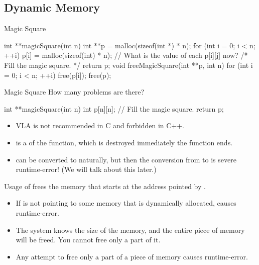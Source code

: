 \documentclass[handout]{beamer}
\begin{document}
\subsection{Dynamic Memory}

\begin{frame}[fragile]{Magic Square}
    \begin{cpp}
int **magicSquare(int n) {
  int **p = malloc(sizeof(int *) * n);
  for (int i = 0; i < n; ++i)
    p[i] = malloc(sizeof(int) * n);
  // What is the value of each p[i][j] now?
  /* Fill the magic square. */
  return p;
}
void freeMagicSquare(int **p, int n) {
  for (int i = 0; i < n; ++i)
    free(p[i]);
  free(p);
}
    \end{cpp}
\end{frame}

\begin{frame}[fragile]{Magic Square}
    How many problems are there?
    \begin{cpp}
int **magicSquare(int n) {
  int p[n][n];
  // Fill the magic square.
  return p;
}
    \end{cpp}
    \pause
    \begin{itemize}
        \item VLA is not recommended in C and forbidden in C++.
        \item {} is a  of the function, which is destroyed immediately the function ends.
        \item {} can be converted to  naturally, but then the conversion from  to  is severe runtime-error! (We will talk about this later.)
    \end{itemize}
\end{frame}

\begin{frame}[fragile]{Usage of }
     frees the memory that starts at the address pointed by .
    \begin{itemize}
        \item If  is not pointing to some memory that is dynamically allocated,  causes runtime-error.
        \item The system knows the size of the memory, and the entire piece of memory will be freed. You cannot free only a part of it.
        \item Any attempt to free only a part of a piece of memory causes runtime-error.
    \end{itemize}
\end{frame}
\end{document}
